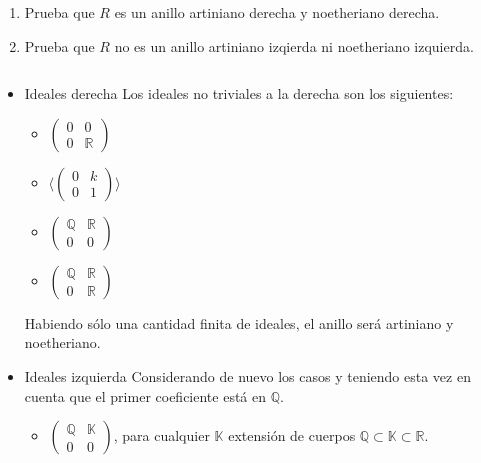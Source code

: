 \documentclass[11pt]{article}
\begin{document}
\begin{itemize}
\begin{statement}
\begin{enumerate}
\item Prueba que $R$ es un anillo artiniano derecha y noetheriano derecha.
\item Prueba que $R$ no es un anillo artiniano izqierda ni noetheriano izquierda.
\end{enumerate}

$\quad$
\end{statement}

\begin{itemize}
\item Ideales derecha
\label{sec-7-4-4-2-1}
Los ideales no triviales a la derecha son los siguientes:

\begin{itemize}
\item $\begin{pmatrix} 0 & 0 \\ 0 & \mathbb{R} \end{pmatrix}$

\item $\langle\begin{pmatrix} 0 & k \\ 0 & 1 \end{pmatrix}\rangle$

\item $\begin{pmatrix} \mathbb{Q} & \mathbb{R} \\ 0 & 0 \end{pmatrix}$

\item $\begin{pmatrix} \mathbb{Q} & \mathbb{R} \\ 0 & \mathbb{R} \end{pmatrix}$
\end{itemize}

Habiendo sólo una cantidad finita de ideales, el anillo será artiniano
y noetheriano.

\item Ideales izquierda
\label{sec-7-4-4-2-2}
Considerando de nuevo los casos y teniendo esta vez en cuenta que el
primer coeficiente está en $\mathbb{Q}$.

\begin{itemize}
\item $\begin{pmatrix} \mathbb{Q} & \mathbb{K} \\ 0 & 0 \end{pmatrix}$, para cualquier $\mathbb{K}$ extensión de cuerpos $\mathbb{Q}\subset \mathbb{K}\subset\mathbb{R}$.


\end{itemize}
\end{itemize}
\end{itemize}
\end{document}
